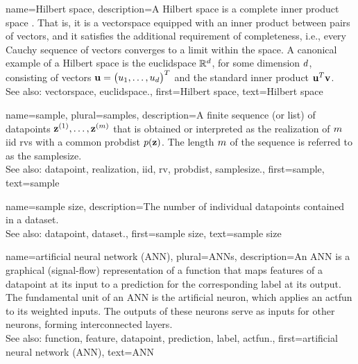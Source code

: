 {name={Hilbert space},
	description={A Hilbert space is a complete inner 
		product space \cite{introhilbertbook}. That is, it is a \gls{vectorspace} equipped 
		with an inner product between pairs of vectors, and it satisfies the additional requirement 
		of completeness, i.e., every Cauchy sequence of vectors converges to a limit within the space. 
		A canonical example of a Hilbert space is the \gls{euclidspace} $\mathbb{R}^{d}$, 
		for some dimension $d$, consisting of vectors ${\bf u} = \big(u_1, \ldots, u_{d}\big)^T$ 
		and the standard inner product ${\bf u}^T {\bf v}$.
				\\
		See also: \gls{vectorspace}, \gls{euclidspace}.},
	first={Hilbert space},
	text={Hilbert space}
}



{name={sample}, plural={samples}, 
	description={A 
		finite sequence (or list) of \glspl{datapoint} ${\bf z}^{(1)},\ldots,{\bf z}^{(m)}$ that 
		is obtained or interpreted as the \gls{realization} of $m$ \gls{iid} \glspl{rv} 
		with a common \gls{probdist} $p({\bf z})$. The length $m$ of 
		the sequence is referred to as the \gls{samplesize}.
				\\
		See also: \gls{datapoint}, \gls{realization}, \gls{iid}, \gls{rv}, \gls{probdist}, \gls{samplesize}.},
		first={sample},
		text={sample}
}
	
{name={sample size},
	description={The number of individual \glspl{datapoint} 
		contained in a \gls{dataset}.
				\\
		See also: \gls{datapoint}, \gls{dataset}.},
	first={sample size},
	text={sample size}
}

{name={artificial neural network (ANN)}, plural={ANNs},
	description={An ANN 
		is a graphical (signal-flow) representation of a \gls{function} that maps 
		\glspl{feature} of a \gls{datapoint} at its input to a \gls{prediction} 
		for the corresponding \gls{label} at its output. The fundamental unit of an 
		ANN is the artificial neuron, which applies an \gls{actfun} to its 
		weighted inputs. The outputs of these neurons serve as inputs for other neurons, 
		forming interconnected layers.
				\\
		See also: \gls{function}, \gls{feature}, \gls{datapoint}, \gls{prediction}, \gls{label}, \gls{actfun}.},
	first={artificial neural network (ANN)},
	text={ANN}
}


